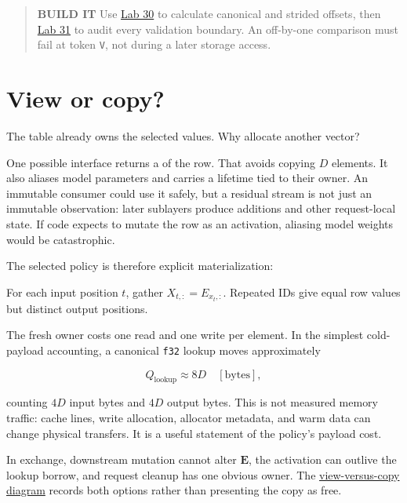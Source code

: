 \begin{quote}
\textbf{BUILD IT} Use
\href{https://github.com/hermonai/inside-the-llm-engine/blob/astra-visual-rewrite/labs/lab-30-inspect-embedding-row.md}{Lab
30} to calculate canonical and strided offsets, then
\href{https://github.com/hermonai/inside-the-llm-engine/blob/astra-visual-rewrite/labs/lab-31-checked-embedding-lookup.md}{Lab
31} to audit every validation boundary. An off-by-one comparison must
fail at token \texttt{V}, not during a later storage access.
\end{quote}

\section{View or copy?}\label{view-or-copy}

The table already owns the selected values. Why allocate another vector?

One possible interface returns a
\texttt{} of the row. That avoids copying
\(D\) elements. It also aliases model parameters and carries a lifetime
tied to their owner. An immutable consumer could use it safely, but a
residual stream is not just an immutable observation: later sublayers
produce additions and other request-local state. If code expects to
mutate the row as an activation, aliasing model weights would be
catastrophic.

The selected  policy is therefore explicit materialization:

For each input position $t$, gather $X_{t,:}=E_{x_t,:}$. Repeated IDs give equal row values but distinct output positions.

The fresh owner costs one read and one write per element. In the
simplest cold-payload accounting, a canonical \texttt{f32} lookup moves
approximately

\begin{equation}
Q_{\mathrm{lookup}}\approx 8D\quad[\mathrm{bytes}],
\end{equation}

counting \(4D\) input bytes and \(4D\) output bytes. This is not
measured memory traffic: cache lines, write allocation, allocator
metadata, and warm data can change physical transfers. It is a useful
statement of the policy's payload cost.

In exchange, downstream mutation cannot alter \(\mathbf{E}\), the
activation can outlive the lookup borrow, and request cleanup has one
obvious owner. The
\href{https://github.com/hermonai/inside-the-llm-engine/blob/astra-visual-rewrite/diagrams/transformer/embedding-view-vs-copy.txt}{view-versus-copy
diagram} records both options rather than presenting the copy as free.

